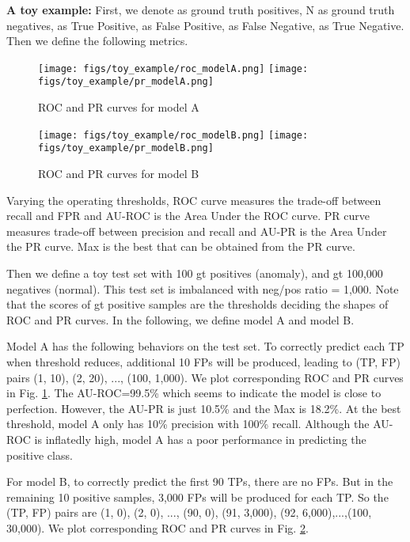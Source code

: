 \documentclass[runningheads]{llncs}
\begin{document}
\noindent\textbf{A toy example: } 
First, we denote  as ground truth positives, N as ground truth negatives,  as True Positive,  as False Positive,  as False Negative,  as True Negative. Then we define the following metrics.









\begin{figure}[!ht]
\centering
\texttt{[image: figs/toy\_example/roc\_modelA.png]}
\texttt{[image: figs/toy\_example/pr\_modelA.png]}\\
 \caption{ROC and PR curves for model A}
 \label{fig:curves_modelA}
\end{figure}

\begin{figure}[!ht]
\centering
\texttt{[image: figs/toy\_example/roc\_modelB.png]}
\texttt{[image: figs/toy\_example/pr\_modelB.png]}\\
 \caption{ROC and PR curves for model B}
 \label{fig:curves_modelB}
\end{figure}

Varying the operating thresholds, ROC curve measures the trade-off between recall and FPR and AU-ROC is the Area Under the ROC curve. PR curve measures trade-off between precision and recall and AU-PR is the Area Under the PR curve. Max  is the best  that can be obtained from the PR curve.

Then we define a toy test set with 100 gt positives (anomaly), and gt 100,000 negatives (normal). This test set is imbalanced with neg/pos ratio = 1,000. Note that the scores of gt positive samples are the thresholds deciding the shapes of ROC and PR curves. In the following, we define model A and model B.

Model A has the following behaviors on the test set. To correctly predict each TP when threshold reduces, additional 10 FPs will be produced, leading to (TP, FP) pairs (1, 10), (2, 20), ..., (100, 1,000). We plot corresponding ROC and PR curves in Fig. \ref{fig:curves_modelA}. The AU-ROC=99.5\% which seems to indicate the model is close to perfection. However, the AU-PR is just 10.5\% and the Max  is 18.2\%. At the best threshold, model A only has 10\% precision with 100\% recall. Although the AU-ROC is inflatedly high, model A has a poor performance in predicting the positive class. 

For model B, to correctly predict the first 90 TPs, there are no FPs. But in the remaining 10 positive samples, 3,000 FPs will be produced for each TP. So the (TP, FP) pairs are (1, 0), (2, 0), ..., (90, 0), (91, 3,000), (92, 6,000),...,(100, 30,000). We plot corresponding ROC and PR curves in Fig. \ref{fig:curves_modelB}. 
\end{document}
